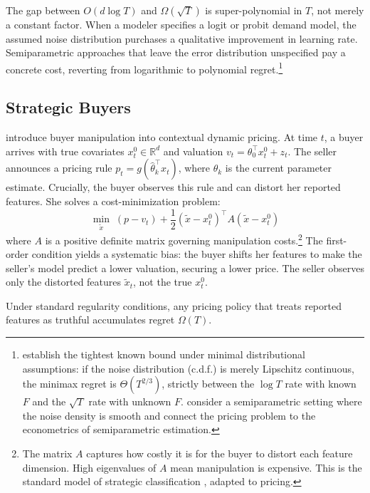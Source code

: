 The gap between $O(d \log T)$ and $\Omega(\sqrt{T})$ is super-polynomial in $T$, not merely a constant factor. When a modeler specifies a logit or probit demand model, the assumed noise distribution purchases a qualitative improvement in learning rate. Semiparametric approaches that leave the error distribution unspecified pay a concrete cost, reverting from logarithmic to polynomial regret.\footnote{\citet{Tullii2024} establish the tightest known bound under minimal distributional assumptions: if the noise distribution (c.d.f.) is merely Lipschitz continuous, the minimax regret is $\Theta(T^{2/3})$, strictly between the $\log T$ rate with known $F$ and the $\sqrt{T}$ rate with unknown $F$. \citet{Fan2024} consider a semiparametric setting where the noise density is smooth and connect the pricing problem to the econometrics of semiparametric estimation.}

\subsection{Strategic Buyers}
\label{sec:liu}

\citet{Liu2024strategic} introduce buyer manipulation into contextual dynamic pricing. At time $t$, a buyer arrives with true covariates $x_t^0 \in \mathbb{R}^d$ and valuation $v_t = \theta_0^\top x_t^0 + z_t$. The seller announces a pricing rule $p_t = g(\hat{\theta}_k^\top x_t)$, where $\hat{\theta}_k$ is the current parameter estimate. Crucially, the buyer observes this rule and can distort her reported features. She solves a cost-minimization problem:
\begin{equation}
\label{eq:manipulation}
\min_{\tilde{x}} \; (p - v_t) + \frac{1}{2}(\tilde{x} - x_t^0)^\top A (\tilde{x} - x_t^0)
\end{equation}
where $A$ is a positive definite matrix governing manipulation costs.\footnote{The matrix $A$ captures how costly it is for the buyer to distort each feature dimension. High eigenvalues of $A$ mean manipulation is expensive. This is the standard model of strategic classification \citep{Hardt2016}, adapted to pricing.} The first-order condition yields a systematic bias: the buyer shifts her features to make the seller's model predict a lower valuation, securing a lower price. The seller observes only the distorted features $\tilde{x}_t$, not the true $x_t^0$.

\begin{theorem}
\label{thm:liu_impossibility}
Under standard regularity conditions, any pricing policy that treats reported features as truthful accumulates regret $\Omega(T)$.
\end{theorem}

